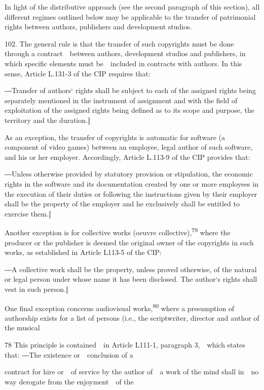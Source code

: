 \documentclass[
]{article}
\begin{document}
{In light of the distributive approach (}{see the second paragraph of
this section}{), all different regimes outlined below may be applicable
to the transfer of patrimonial rights between authors, publishers and
development studios.}

{102. }{The general rule is that the transfer of such copyrights must be
done through a contract~~between authors, development studios and
publishers, in which specific elements must be~~included in contracts
with authors. In this sense, Article L.131-3 of the }{CIP }{requires
that:}

{―}{Transfer of authors` rights shall be subject to each of the assigned
rights }{being separately mentioned in the instrument of assignment and
with the field of exploitation of the assigned rights being defined as
to its scope and purpose, the territory and the duration.}{‖}

{As an exception, the transfer of copyrights is automatic for software
(a component of video games) between an employee, legal author of such
software, and his or her employer. Accordingly, Article L.113-9 of the
}{CIP }{provides that:}

{―Unless otherwise provided by statutory provision or stipulation, the
economic }{rights in the software and its documentation created by one
or more employees in the execution of their duties or following the
instructions given by their employer shall be the property of the
employer and he exclusively shall }{be entitled to exercise them.‖}

{Another exception is for collective works (}{oeuvre
collective}{),}\textsuperscript{{79 }}{where the producer or the
publisher is deemed the original owner of the copyrights in such works,
as established in Article L113-5 of the }{CIP}{:}

{―A collective work shall be the property, unless proved otherwise, of
the }{natural or legal person under whose name it has been disclosed.
}{The author`s rights shall vest in such person.}{‖}

{One final exception concerns audiovisual works,}\textsuperscript{{80
}}{where a presumption of authorship exists for a list of persons (i.e.,
the scriptwriter, director and author of the musical}

{78 }{This principle is contained~~in Article L111-1, paragraph
3,~~which states that: }{―}{The existence or~~conclusion of a}

{contract for hire or~~of service by the author of~~a work of the mind
shall in~~no way derogate from the enjoyment~~of the}
\end{document}
